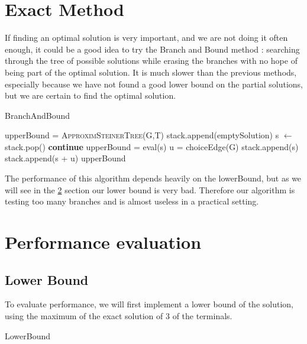 \documentclass{article}
\begin{document}
\section{Exact Method}

If finding an optimal solution is very important, and we are not doing it often enough, it could be a good idea to try the Branch and Bound method : searching through the tree of possible solutions while erasing the branches with no hope of being part of the optimal solution. It is much slower than the previous methods, especially because we have not found a good lower bound on the partial solutions, but we are certain to find the optimal solution.

\begin{algorithm}
\caption{BranchAndBound}
\begin{algorithmic}
    \State upperBound = \textsc{ApproximSteinerTree(G,T)}
    \State stack.append(emptySolution)
        \State s $\gets$ stack.pop()
             \textbf{continue}
        \EndIf
            upperBound = eval(s)
        \EndIf
        \State u = choiceEdge(G)
        \State stack.append(s)
        \State stack.append(s + u)
    \EndWhile
    \Return upperBound
    \EndFunction
\end{algorithmic}
\end{algorithm}
The performance of this algorithm depends heavily on the lowerBound, but as we will see in the \ref{Performance evaluation} section our lower bound is very bad. Therefore our algorithm is testing too many branches and is almost useless in a practical setting.
\newpage
\section{Performance evaluation} \label{Performance evaluation}
\subsection{Lower Bound}
To evaluate performance, we will first implement a lower bound of the solution, using the maximum of the exact solution of 3 of the terminals.
\begin{algorithm}
\caption{LowerBound}
\begin{algorithmic}[1]
        \State {}
    \EndFunction\\
       \State {}
    \EndFunction
\end{algorithmic}
\end{algorithm}
\end{document}
